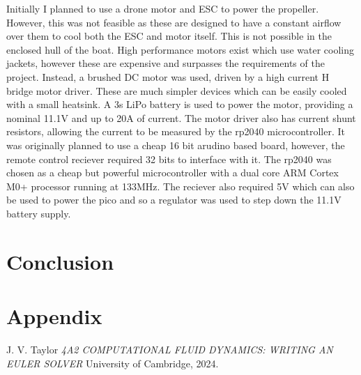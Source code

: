 \documentclass{article}
\begin{document}
Initially I planned to use a drone motor and ESC to power the propeller.
However, this was not feasible as these are designed to have a constant airflow over them to cool both the ESC and motor itself.
This is not possible in the enclosed hull of the boat.
High performance motors exist which use water cooling jackets, however these are expensive and surpasses the requirements of the project.
Instead, a brushed DC motor was used, driven by a high current H bridge motor driver.
These are much simpler devices which can be easily cooled with a small heatsink.
A 3s LiPo battery is used to power the motor, providing a nominal 11.1V and up to 20A of current.
The motor driver also has current shunt resistors, allowing the current to be measured by the rp2040 microcontroller.
It was originally planned to use a cheap 16 bit arudino based board, however, the remote control reciever required 32 bits to interface with it.
The rp2040 was chosen as a cheap but powerful microcontroller with a dual core ARM Cortex M0+ processor running at 133MHz.
The reciever also required 5V which can also be used to power the pico and so a regulator was used to step down the 11.1V battery supply.


\section{Conclusion}


\section{Appendix}



\begin{thebibliography}{9}

  J. V. Taylor
  \emph{4A2 COMPUTATIONAL FLUID DYNAMICS: WRITING AN EULER SOLVER}
  University of Cambridge,
  2024.

\end{thebibliography}
\end{document}
